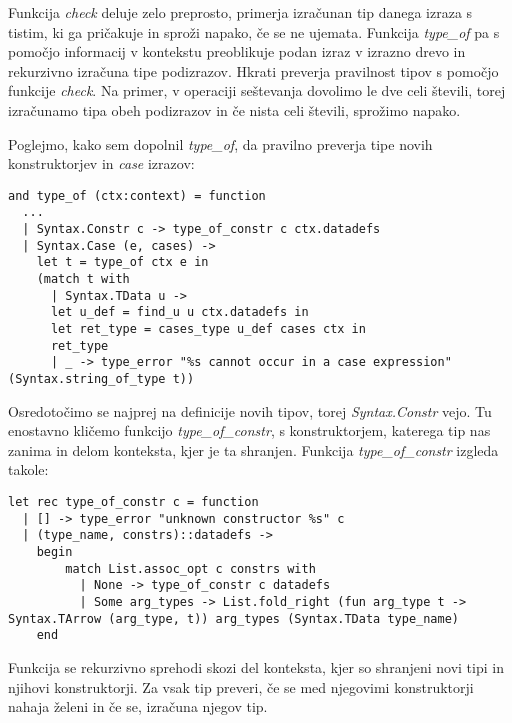 \documentclass[12pt,a4paper,openany]{book}
\begin{document}
Funkcija \emph{check} deluje zelo preprosto, primerja izračunan tip danega izraza s tistim, ki ga pričakuje in sproži napako, če se ne ujemata. Funkcija \emph{type\_of} pa s pomočjo informacij 
v kontekstu preoblikuje podan izraz v izrazno drevo in rekurzivno izračuna tipe podizrazov. Hkrati preverja pravilnost tipov s pomočjo funkcije \emph{check}. Na primer, v operaciji seštevanja 
dovolimo le dve celi števili, torej izračunamo tipa obeh podizrazov in če nista celi števili, sprožimo napako.

Poglejmo, kako sem dopolnil \emph{type\_of}, da pravilno preverja tipe novih konstruktorjev in \emph{case} izrazov:
\begin{lstlisting}
and type_of (ctx:context) = function
  ...
  | Syntax.Constr c -> type_of_constr c ctx.datadefs
  | Syntax.Case (e, cases) -> 
    let t = type_of ctx e in
    (match t with
      | Syntax.TData u -> 
      let u_def = find_u u ctx.datadefs in
      let ret_type = cases_type u_def cases ctx in
      ret_type
      | _ -> type_error "%s cannot occur in a case expression" (Syntax.string_of_type t))
\end{lstlisting}
Osredotočimo se najprej na definicije novih tipov, torej \emph{Syntax.Constr} vejo. Tu enostavno kličemo funkcijo \emph{type\_of\_constr}, s konstruktorjem, katerega tip nas zanima in delom 
konteksta, kjer je ta shranjen. Funkcija \emph{type\_of\_constr} izgleda takole:
\begin{lstlisting}
let rec type_of_constr c = function
  | [] -> type_error "unknown constructor %s" c
  | (type_name, constrs)::datadefs -> 
    begin
        match List.assoc_opt c constrs with
          | None -> type_of_constr c datadefs
          | Some arg_types -> List.fold_right (fun arg_type t -> Syntax.TArrow (arg_type, t)) arg_types (Syntax.TData type_name) 
    end
\end{lstlisting}
Funkcija se rekurzivno sprehodi skozi del konteksta, kjer so shranjeni novi tipi in njihovi konstruktorji. Za vsak tip preveri, če se med njegovimi konstruktorji nahaja želeni in če se, izračuna 
njegov tip. 
\end{document}
